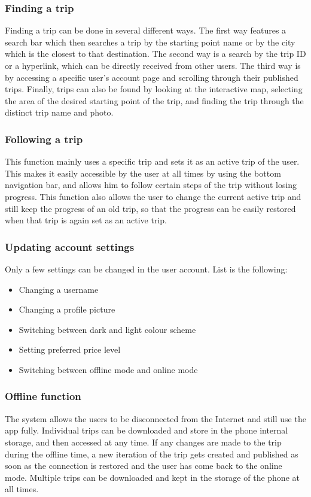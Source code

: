 \subsubsection{Finding a trip}
\hspace{\parindent}Finding a trip can be done in several different ways. The first way features a search bar which then searches a trip by the starting point name or by the city which is the closest to that destination. The second way is a search by the trip ID or a hyperlink, which can be directly received from other users. The third way is by accessing a specific user's account page and scrolling through their published trips. Finally, trips can also be found by looking at the interactive map, selecting the area of the desired starting point of the trip, and finding the trip through the distinct trip name and photo.  
\subsubsection{Following a trip}
\hspace{\parindent}This function mainly uses a specific trip and sets it as an active trip of the user. This makes it easily accessible by the user at all times by using the bottom navigation bar, and allows him to follow certain steps of the trip without losing progress. This function also allows the user to change the current active trip and still keep the progress of an old trip, so that the progress can be easily restored when that trip is again set as an active trip.
\subsubsection{Updating account settings}
\hspace{\parindent}Only a few settings can be changed in the user account. List is the following:
\begin{itemize}
\item Changing a username
\item Changing a profile picture
\item Switching between dark and light colour scheme
\item Setting preferred price level
\item Switching between offline mode and online mode
\end{itemize}
\subsubsection{Offline function}
\hspace{\parindent}The system allows the users to be disconnected from the Internet and still use the app fully. Individual trips can be downloaded and store in the phone internal storage, and then accessed at any time. If any changes are made to the trip during the offline time, a new iteration of the trip gets created and published as soon as the connection is restored and the user has come back to the online mode. Multiple trips can be downloaded and kept in the storage of the phone at all times.  


